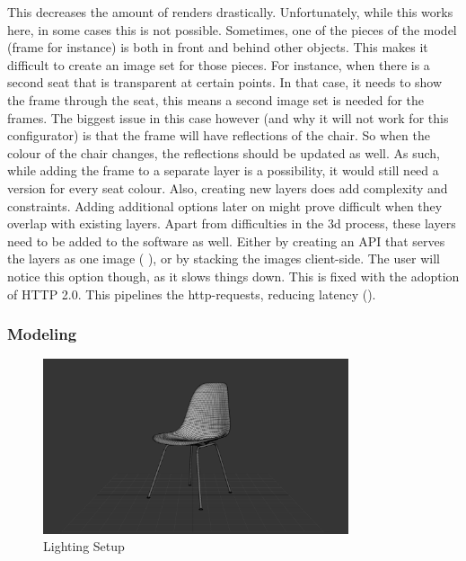 This decreases the amount of renders drastically. Unfortunately, while this works here, in some cases this is not possible. Sometimes, one of the pieces of the model (frame for instance) is both in front and behind other objects. This makes it difficult to create an image set for those pieces. For instance, when there is a second seat that is transparent at certain points. In that case, it needs to show the frame through the seat, this means a second image set is needed for the frames. The biggest issue in this case however (and why it will not work for this configurator) is that the frame will have reflections of the chair. So when the colour of the chair changes, the reflections should be updated as well. As such, while adding the frame to a separate layer is a possibility, it would still need a version for every seat colour. Also, creating new layers does add complexity and constraints. Adding additional options later on might prove difficult when they overlap with existing layers.
\newline
Apart from difficulties in the 3d process, these layers need to be added to the software as well. Either by creating an API that serves the layers as one image (\cite{bugaboo} ), or by stacking the images client-side. The user will notice this option though, as it slows things down. This is fixed with the adoption of HTTP 2.0. This pipelines the http-requests, reducing latency (\cite{latency}).

\subsubsection{Modeling}

\begin{figure}
\vspace{-1cm}
\centering
\includegraphics[width=9cm]{images/modeling}
\caption{Lighting Setup}
\label{figure:modeling}
\end{figure}


